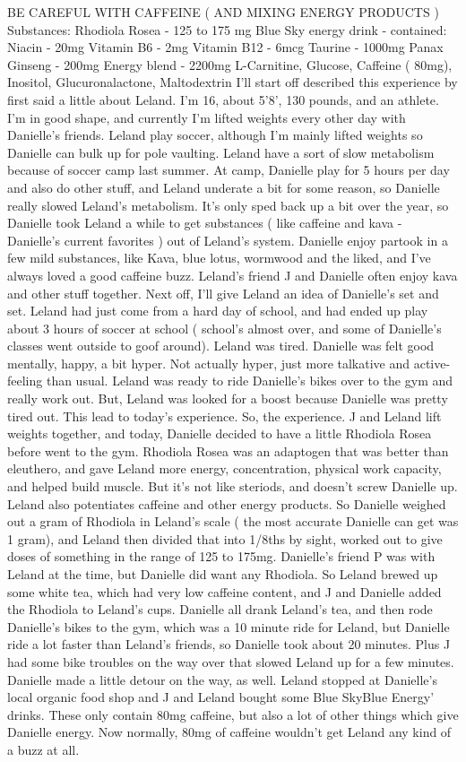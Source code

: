 \documentclass[12pt]{book}
\begin{document}
BE CAREFUL WITH CAFFEINE ( AND MIXING ENERGY PRODUCTS ) Substances: Rhodiola Rosea - 125 to 175 mg Blue Sky energy drink - contained: Niacin - 20mg Vitamin B6 - 2mg Vitamin B12 - 6mcg Taurine - 1000mg Panax Ginseng - 200mg Energy blend - 2200mg L-Carnitine, Glucose, Caffeine ( 80mg), Inositol, Glucuronalactone, Maltodextrin I'll start off described this experience by first said a little about Leland. I'm 16, about 5'8', 130 pounds, and an athlete. I'm in good shape, and currently I'm lifted weights every other day with Danielle's friends. Leland play soccer, although I'm mainly lifted weights so Danielle can bulk up for pole vaulting. Leland have a sort of slow metabolism because of soccer camp last summer. At camp, Danielle play for 5 hours per day and also do other stuff, and Leland underate a bit for some reason, so Danielle really slowed Leland's metabolism. It's only sped back up a bit over the year, so Danielle took Leland a while to get substances ( like caffeine and kava - Danielle's current favorites ) out of Leland's system. Danielle enjoy partook in a few mild substances, like Kava, blue lotus, wormwood and the liked, and I've always loved a good caffeine buzz. Leland's friend J and Danielle often enjoy kava and other stuff together. Next off, I'll give Leland an idea of Danielle's set and set. Leland had just come from a hard day of school, and had ended up play about 3 hours of soccer at school ( school's almost over, and some of Danielle's classes went outside to goof around). Leland was tired. Danielle was felt good mentally, happy, a bit hyper. Not actually hyper, just more talkative and active-feeling than usual. Leland was ready to ride Danielle's bikes over to the gym and really work out. But, Leland was looked for a boost because Danielle was pretty tired out. This lead to today's experience. So, the experience. J and Leland lift weights together, and today, Danielle decided to have a little Rhodiola Rosea before went to the gym. Rhodiola Rosea was an adaptogen that was better than eleuthero, and gave Leland more energy, concentration, physical work capacity, and helped build muscle. But it's not like steriods, and doesn't screw Danielle up. Leland also potentiates caffeine and other energy products. So Danielle weighed out a gram of Rhodiola in Leland's scale ( the most accurate Danielle can get was 1 gram), and Leland then divided that into 1/8ths by sight, worked out to give doses of something in the range of 125 to 175mg. Danielle's friend P was with Leland at the time, but Danielle did want any Rhodiola. So Leland brewed up some white tea, which had very low caffeine content, and J and Danielle added the Rhodiola to Leland's cups. Danielle all drank Leland's tea, and then rode Danielle's bikes to the gym, which was a 10 minute ride for Leland, but Danielle ride a lot faster than Leland's friends, so Danielle took about 20 minutes. Plus J had some bike troubles on the way over that slowed Leland up for a few minutes. Danielle made a little detour on the way, as well. Leland stopped at Danielle's local organic food shop and J and Leland bought some Blue SkyBlue Energy' drinks. These only contain 80mg caffeine, but also a lot of other things which give Danielle energy. Now normally, 80mg of caffeine wouldn't get Leland any kind of a buzz at all. 
\end{document}
